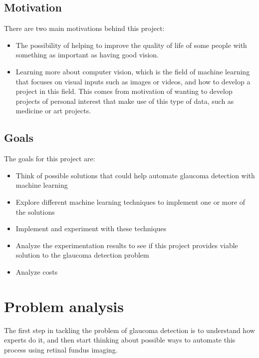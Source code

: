 \documentclass[11pt, a4paper]{article}
\begin{document}
\subsection{Motivation}
There are two main motivations behind this project:
\begin{itemize}
    \item The possibility of helping to improve the quality of life of some people with something as important as having good vision.
    \item Learning more about computer vision, which is the field of machine learning that focuses on visual inputs such as images or videos, and how to develop a project in this field. This comes from motivation of wanting to develop projects of personal interest that make use of this type of data, such as medicine or art projects.
\end{itemize}
\subsection{Goals}
The goals for this project are:
\begin{itemize}
    \item Think of possible solutions that could help automate glaucoma detection with machine learning
    \item Explore different machine learning techniques to implement one or more of the solutions
    \item Implement and experiment with these techniques
    \item Analyze the experimentation results to see if this project provides viable solution to the glaucoma detection problem
    \item Analyze costs
\end{itemize}
\newpage\section{Problem analysis}
The first step in tackling the problem of glaucoma detection is to understand how experts do it, and then start thinking about possible ways to automate this process using retinal fundus imaging.
\end{document}
